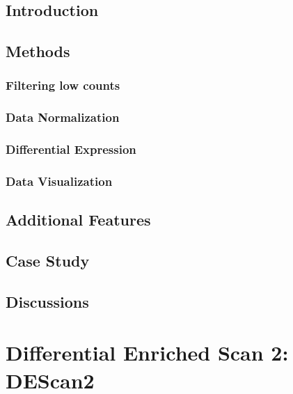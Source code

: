 \documentclass[b5paper, oneside, british, intoc, bibliograph=totoc, index=totoc, BCOR10mm, twoside, openright]{book}
\numberwithin{equation}{section}
\numberwithin{figure}{section}
\begin{document}
\section{Introduction} \label{sec:ticorseintro}

\section{Methods} \label{sec:ticorseintromethods}

\subsection{Filtering low counts} \label{sec:ticorserfiltering}

\subsection{Data Normalization} \label{sec:ticorsernormalization}

\subsection{Differential Expression} \label{sec:ticorsermethods}

\subsection{Data Visualization} \label{sec:ticorserplots}

\section{Additional Features} \label{sec:ticorseraddfeat}

\section{Case Study} \label{sec:ticorseresults}

\section{Discussions} \label{sec:ticorseconclusions}



\chapter{Differential Enriched Scan 2: DEScan2} \label{sec:descan2cap}

\end{document}
